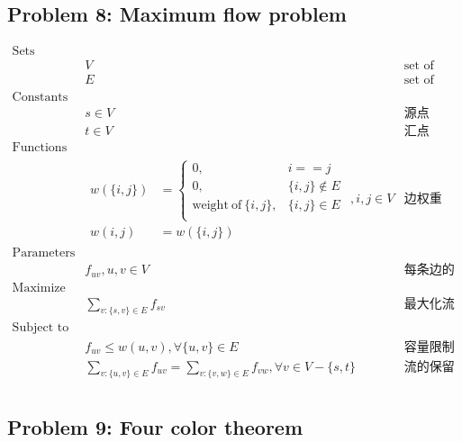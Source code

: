 \documentclass[11pt]{article}
\begin{document}
\newpage
\subsection*{Problem 8: Maximum flow problem}

\begin{eqnarray*}
    \textrm{Sets} \\
        & V & \textrm{set of vertices} \\
        & E & \textrm{set of edges} \\
    \textrm{Constants} \\
        & s \in V & \textrm{源点} \\
        & t \in V & \textrm{汇点} \\
    \textrm{Functions} \\
        & \begin{array}{rl}
            w(\{i, j\}) &= \left\{
                \begin{array}{ll}
                    0, & i == j \\
                    0, & \{i, j\} \notin E \\
                    \mathrm{weight\ of\ }\{i, j\}, & \{i, j\} \in E \\
                \end{array}
            \right. \\
            w(i, j) &= w(\{i, j\})
        \end{array}, i, j \in V & \textrm{边权重} \\
    \textrm{Parameters} \\
        & f_{uv}, u, v \in V & \textrm{每条边的流量} \\
    \textrm{Maximize} \\
        & \displaystyle \sum_{v: \{s, v\} \in E} f_{sv} & \textrm{最大化流} \\
    \textrm{Subject to} \\
        & f_{uv} \leq w(u, v), \forall \{u, v\} \in E & \textrm{容量限制} \\
        & \displaystyle \sum_{v: \{u, v\} \in E} f_{uv} = \sum_{v: \{v, w\} \in E} f_{vw}, \forall v \in V - \{s, t\} & \textrm{流的保留} \\ 
\end{eqnarray*}


\newpage
\subsection*{Problem 9: Four color theorem}
\end{document}
